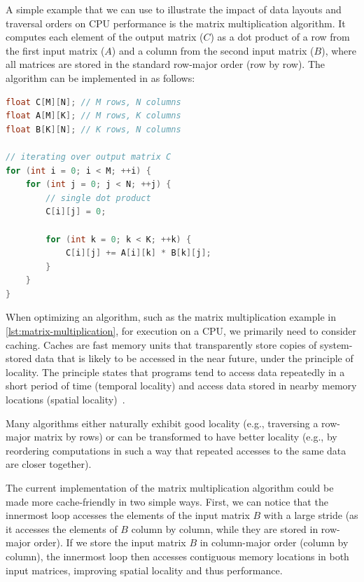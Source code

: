 A simple example that we can use to illustrate the impact of data layouts and traversal orders on CPU performance is the matrix multiplication algorithm. It computes each element of the output matrix ($C$) as a dot product of a row from the first input matrix ($A$) and a column from the second input matrix ($B$), where all matrices are stored in the standard row-major order (row by row). The algorithm can be implemented in \cpp as follows:

\begin{lstlisting}[language=C++, caption={Matrix multiplication}, label={lst:matrix-multiplication}]
float C[M][N]; // M rows, N columns
float A[M][K]; // M rows, K columns
float B[K][N]; // K rows, N columns

// iterating over output matrix C
for (int i = 0; i < M; ++i) {
    for (int j = 0; j < N; ++j) {
        // single dot product
        C[i][j] = 0;

        for (int k = 0; k < K; ++k) {
            C[i][j] += A[i][k] * B[k][j];
        }
    }
}
\end{lstlisting}

When optimizing an algorithm, such as the matrix multiplication example in \cref{lst:matrix-multiplication}, for execution on a CPU, we primarily need to consider caching. Caches are fast memory units that transparently store copies of system-stored data that is likely to be accessed in the near future, under the principle of locality. The principle states that programs tend to access data repeatedly in a short period of time (temporal locality) and access data stored in nearby memory locations (spatial locality)~\cite{hennessy2019computer}.

Many algorithms either naturally exhibit good locality (e.g., traversing a row-major matrix by rows) or can be transformed to have better locality (e.g., by reordering computations in such a way that repeated accesses to the same data are closer together).

The current implementation of the matrix multiplication algorithm could be made more cache-friendly in two simple ways. First, we can notice that the innermost loop accesses the elements of the input matrix $B$ with a large stride (as it accesses the elements of $B$ column by column, while they are stored in row-major order). If we store the input matrix $B$ in column-major order (column by column), the innermost loop then accesses contiguous memory locations in both input matrices, improving spatial locality and thus performance.

